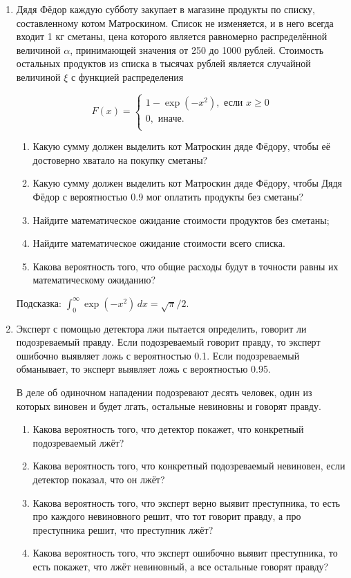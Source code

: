 \begin{enumerate}
\item Дядя Фёдор каждую субботу закупает в магазине продукты по списку, составленному котом Матроскином. Список не изменяется, и в него всегда входит 1 кг сметаны, цена которого является равномерно распределённой величиной $\alpha$, принимающей значения от 250 до 1000 рублей. Стоимость остальных продуктов из списка в тысячах рублей является случайной величиной $\xi$ с функцией распределения

\[
F(x)=\begin{cases}
1-\exp(-x^2 ), \text{ если } x \geq 0 \\
0, \text{ иначе.}\\
\end{cases}
\]

\begin{enumerate}
\item Какую сумму должен выделить кот Матроскин дяде Фёдору, чтобы её достоверно хватало на покупку сметаны?
\item Какую сумму должен выделить кот Матроскин дяде Фёдору, чтобы Дядя Фёдор с вероятностью 0.9 мог оплатить продукты без сметаны?
\item Найдите математическое ожидание стоимости продуктов без сметаны;
\item Найдите математическое ожидание стоимости всего списка.
\item Какова вероятность того, что общие расходы будут в точности равны их математическому ожиданию?
\end{enumerate}

Подсказка: $\int_0^{\infty} \exp(-x^2) \, dx = \sqrt{\pi} / 2$.

\item Эксперт с помощью детектора лжи пытается определить, говорит ли подозреваемый правду. Если подозреваемый говорит правду, то эксперт ошибочно выявляет ложь с вероятностью 0.1. Если подозреваемый обманывает, то эксперт выявляет ложь с вероятностью 0.95.

В деле об одиночном нападении подозревают десять человек, один из которых виновен и будет лгать, остальные невиновны и говорят правду.

\begin{enumerate}
\item Какова вероятность того, что детектор покажет, что конкретный подозреваемый лжёт?
\item Какова вероятность того, что конкретный подозреваемый невиновен, если детектор показал, что он лжёт?
\item Какова вероятность того, что эксперт верно выявит преступника,
то есть про каждого невиновного решит, что тот говорит правду, а про преступника решит, что
преступник лжёт?
\item Какова вероятность того, что эксперт ошибочно выявит  преступника, то есть покажет, что лжёт невиновный, а все остальные говорят правду?
\end{enumerate}
\end{enumerate}


